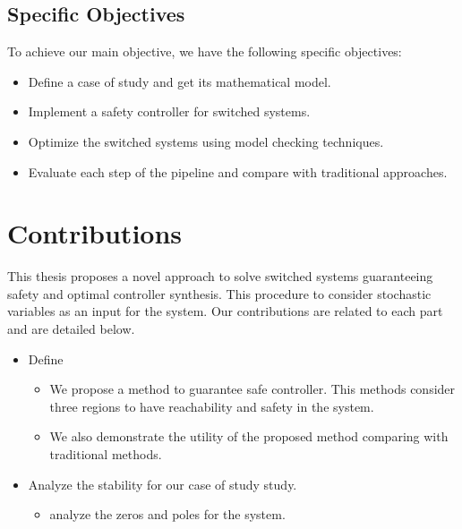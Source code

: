         \subsection*{Specific Objectives}
        To achieve our main objective, we have the following specific objectives:
        \begin{itemize}
            \item Define a case of study and get its mathematical model.
            \item Implement a safety controller for switched systems.
            \item Optimize the switched systems using model checking techniques.
            \item Evaluate each step of the pipeline and compare with traditional approaches.
        \end{itemize}


    \section{Contributions}
        This thesis proposes a novel approach to solve switched systems guaranteeing safety and optimal controller synthesis. This procedure to consider stochastic variables as an input for the system. Our contributions are related to each part and are detailed below.

        \begin{itemize}%
        \item Define %
        \begin{itemize}%
        \item We propose a method to guarantee safe controller. This methods consider three regions to have reachability and safety in the system.
        \item We also demonstrate the utility of the proposed method comparing with traditional methods.
        \end{itemize}
        \item Analyze the stability for our case of study study.
        \begin{itemize}
        \item analyze the zeros and poles for the system.
        \end{itemize}
        \end{itemize}

